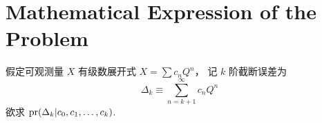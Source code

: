 
\section{Mathematical Expression of the Problem}
假定可观测量 $X$ 有级数展开式 $X=\sum c_nQ^n$，
记 $k$ 阶截断误差为
\begin{equation}
  \Delta_k\equiv\sum_{n=k+1}^\infty c_nQ^n
\end{equation}
欲求 $\textrm{pr}(\Delta_k|c_0,c_1,\ldots,c_k)$.
